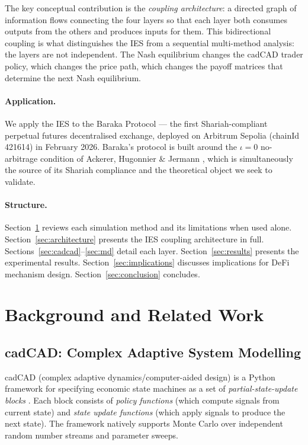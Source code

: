 \documentclass[10pt,twocolumn]{article}
\theoremstyle{plain}
\theoremstyle{definition}
\begin{document}
The key conceptual contribution is the \emph{coupling
architecture}: a directed graph of information flows connecting
the four layers so that each layer both consumes outputs from
the others and produces inputs for them.  This bidirectional
coupling is what distinguishes the IES from a sequential
multi-method analysis: the layers are not independent.
The Nash equilibrium changes the cadCAD trader policy, which
changes the price path, which changes the payoff matrices
that determine the next Nash equilibrium.

\paragraph{Application.}  We apply the IES to the
Baraka Protocol \cite{Ahmed2026a} --- the first Shariah-compliant
perpetual futures decentralised exchange, deployed on Arbitrum
Sepolia (chainId 421614) in February 2026.  Baraka's protocol
is built around the $\iota=0$ no-arbitrage condition of
Ackerer, Hugonnier \& Jermann \cite{Ackerer2024}, which is
simultaneously the source of its Shariah compliance and the
theoretical object we seek to validate.

\paragraph{Structure.}  Section~\ref{sec:background} reviews
each simulation method and its limitations when used alone.
Section~\ref{sec:architecture} presents the IES coupling
architecture in full.  Sections~\ref{sec:cadcad}--\ref{sec:md}
detail each layer.  Section~\ref{sec:results} presents the
experimental results.  Section~\ref{sec:implications} discusses
implications for DeFi mechanism design.
Section~\ref{sec:conclusion} concludes.

\section{Background and Related Work}
\label{sec:background}

\subsection{cadCAD: Complex Adaptive System Modelling}

cadCAD (complex adaptive dynamics/computer-aided design) is
a Python framework for specifying economic state machines as
a set of \emph{partial-state-update blocks}
\cite{Zargham2020,BlockScience2020}.
Each block consists of \emph{policy functions} (which compute
signals from current state) and \emph{state update functions}
(which apply signals to produce the next state).  The framework
natively supports Monte Carlo over independent random number
streams and parameter sweeps.
\end{document}
